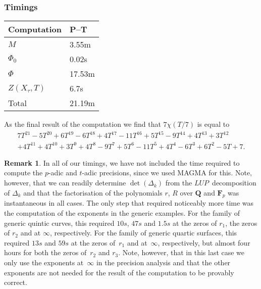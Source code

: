 \documentclass[a4paper,11pt]{article}
\numberwithin{equation}{section}
\newcommand{\QQ}{\mathbf{Q}} %
\newcommand{\FF}{\mathbf{F}} %
\theoremstyle{definition}
\newtheorem{rem}[thm]{Remark}
\begin{document}
\subsubsection{Timings}

\begin{center}
\begin{tabular}{l l} \toprule
Computation     & P--T \\ \midrule
$M$             & 3.55m     \\
$\Phi_0$        & 0.02s     \\
$\Phi$          & 17.53m     \\
$Z(X_{\tau},T)$ & 6.7s     \\
Total           & 21.19m     \\ \bottomrule
\end{tabular}
\end{center}

As the final result of the computation we find that $7 \chi(T/7)$ is equal to 
\begin{multline*}
7T^{21} - 5T^{20} + 6T^{19} - 6T^{18} + 4T^{17} - 11T^{16} + 5T^{15} - 9T^{14} + 4T^{13} + 3T^{12} \\
+ 4T^{11} + 4T^{10} + 3T^9 + 4T^8 - 9T^7 + 5T^6 - 11T^5 + 4T^4 - 6T^3 + 6T^2 - 5T + 7.
\end{multline*}

\begin{rem}
In all of our timings, we have not included the time required to compute 
the $p$-adic and $t$-adic precisions, since we used MAGMA for this. Note, 
however, that we can readily determine $\det(\Delta_k)$ from the 
$LUP$~decomposition of $\Delta_k$ and that the factorisation of the 
polynomials $r$, $R$ over $\QQ$ and $\FF_p$ was instantaneous in all 
cases. The only step that required noticeably more time was the 
computation of the exponents in the generic examples. For the family of 
generic quintic curves, this required $10s$, $47s$ and $1.5s$ at the 
zeros of $r_1$, the zeros of $r_2$ and at $\infty$, respectively. For the 
family of generic quartic surfaces, this required $13s$ and $59s$ at the 
zeros of~$r_1$ and at~$\infty$, respectively, but almost four hours for 
both the zeros of~$r_2$ and $r_3$.  Note, however, that in this last case 
we only use the exponents at~$\infty$ in the precision analysis and that
the other exponents are not needed for the result of the computation to
be provably correct.
\end{rem}




\end{document}
